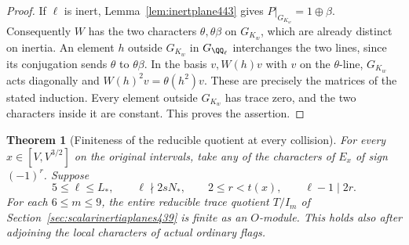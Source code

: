 \documentclass[a4paper,11pt]{article}
\newtheorem{theorem}[proposition]{Theorem}
\theoremstyle{definition}
\theoremstyle{remark}
\numberwithin{equation}{section}
\begin{document}
\begin{proof}
If \(\ell\) is inert, Lemma~\ref{lem:inertplane443} gives
\(P|_{G_{K_w}}=1\oplus\beta\). Consequently \(W\) has the
two characters \(\theta,\theta\beta\) on \(G_{K_w}\), which
are already distinct on inertia. An element \(h\) outside
\(G_{K_w}\) in \(G_{\QQ_\ell}\) interchanges the two lines,
since its conjugation sends \(\theta\) to \(\theta\beta\).
In the basis \(v,W(h)v\) with \(v\) on the \(\theta\)-line,
\(G_{K_w}\) acts diagonally and \(W(h)^2v=\theta(h^2)v\).
These are precisely the matrices of the stated induction.
Every element outside \(G_{K_w}\) has trace zero, and the two
characters inside it are constant. This proves the assertion.
\end{proof}

\begin{theorem}[Finiteness of the reducible quotient at every collision]\leavevmode
\label{thm:allcollisiontraces445}
For every \(x\in[V,V^{3/2}]\) on the original intervals, take
any of the characters of \(E_x\) of sign \((-1)^r\). Suppose
\[
  5\le\ell\le L_*,\qquad \ell\nmid2sN_*,\qquad
  2\le r<t(x),\qquad \ell-1\mid2r .
\]
For each \(6\le m\le9\), the entire reducible trace quotient
\(T/I_m\) of Section~\ref{sec:scalarinertiaplanes439} is
finite as an \(O\)-module. This holds also after adjoining
the local characters of actual ordinary flags.
\end{theorem}
\end{document}
